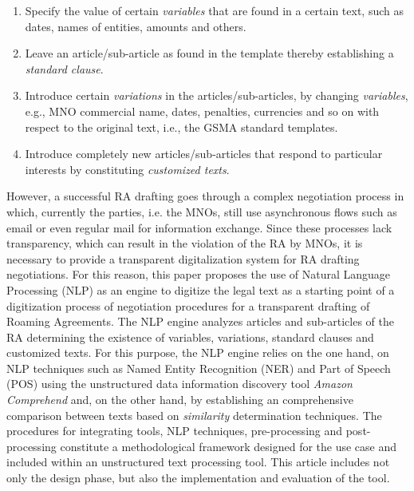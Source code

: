 \documentclass[conference]{style/IEEEtran}
\begin{document}
\begin{enumerate}
\item Specify the value of certain \textit{variables} that are found in a certain text, such as dates, names of entities, amounts and others.

\item Leave an article/sub-article as found in the template thereby establishing a \textit{standard clause}.

\item Introduce certain \textit{variations} in the articles/sub-articles, by changing \textit{variables}, e.g., MNO commercial name, dates, penalties, currencies and so on with respect to the original text, i.e., the GSMA standard templates.

\item Introduce completely new articles/sub-articles that respond to particular interests by constituting \textit{customized texts}.

\end{enumerate}

However, a successful RA drafting goes through a complex negotiation process in which, currently the parties, i.e. the MNOs, still use asynchronous flows such as email or even regular mail for information exchange. Since these processes lack transparency, which can result in the violation of the RA by MNOs, it is necessary to provide a transparent digitalization system for RA drafting negotiations. For this reason, this paper proposes the use of Natural Language Processing (NLP) as an engine to digitize the legal text as a starting point of a digitization process of negotiation procedures for a transparent drafting of Roaming Agreements. The NLP engine analyzes articles and sub-articles of the RA determining the existence of variables, variations, standard clauses and customized texts. For this purpose, the NLP engine relies on the one hand, on NLP techniques such as Named Entity Recognition (NER) and Part of Speech (POS) using the unstructured data information discovery tool \textit{Amazon Comprehend} and, on the other hand, by establishing an comprehensive comparison between texts based on \textit{similarity} determination techniques. The procedures for integrating tools, NLP techniques, pre-processing and post-processing constitute a methodological framework designed for the use case and included within an unstructured text processing tool. This article includes not only the design phase, but also the implementation and evaluation of the tool.
\end{document}

